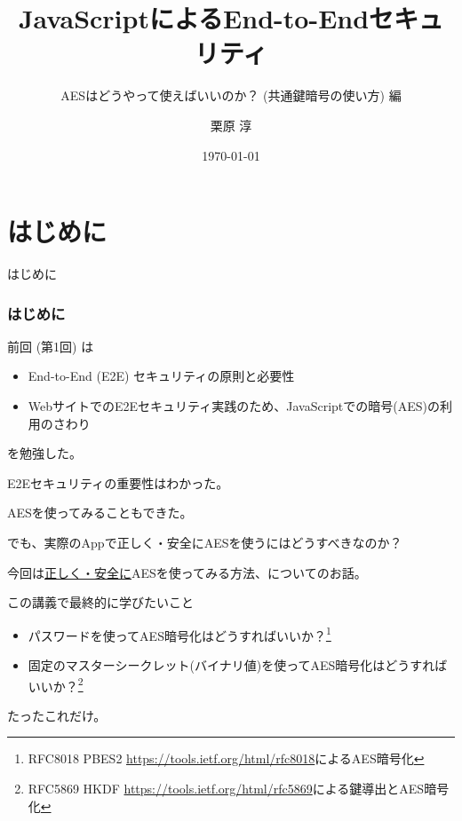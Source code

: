 \documentclass[12pt,dvipdfmx]{beamer}
\title[E2E Security with JS]{JavaScriptによるEnd-to-Endセキュリティ}
\subtitle{AESはどうやって使えばいいのか？ (共通鍵暗号の使い方) 編}
\author[Jun Kurihara]{栗原 淳}
\institute[]{}
\date[\today]{\today}
\begin{document}
\begin{frame}
\titlepage
\end{frame}

\section{はじめに}
\begin{frame}
 \centering
 {\Large はじめに}
\end{frame}

\begin{frame}
\frametitle{はじめに}
前回 (第1回) は
\begin{itemize}
 \item End-to-End (E2E) セキュリティの原則と必要性
 \item WebサイトでのE2Eセキュリティ実践のため、JavaScriptでの暗号(AES)の利用のさわり
\end{itemize}
を勉強した。

\vspace{2ex}

E2Eセキュリティの重要性はわかった。

AESを使ってみることもできた。

\vspace{2ex}

でも、実際のAppで\alert{正しく・安全にAESを使うにはどうすべきなのか？}
\end{frame}

\begin{frame}
今回は\underline{正しく・安全に}AESを使ってみる方法、についてのお話。

\begin{block}{\small この講義で最終的に学びたいこと}
\begin{itemize}
\item パスワードを使ってAES暗号化はどうすればいいか？\footnote[frame]{\scriptsize RFC8018 PBES2 \url{https://tools.ietf.org/html/rfc8018}によるAES暗号化}
\item 固定のマスターシークレット(バイナリ値)を使ってAES暗号化はどうすればいいか？\footnote[frame]{\scriptsize RFC5869 HKDF \url{https://tools.ietf.org/html/rfc5869}による鍵導出とAES暗号化}
\end{itemize}
\end{block}

\vspace{2ex}

たったこれだけ。

\end{frame}
\end{document}
